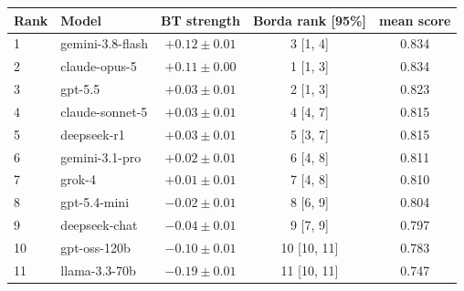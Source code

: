 \begin{tabular}{llccc}
\toprule
Rank & Model & BT strength & Borda rank [95\%] & mean score \\
\midrule
1 & gemini-3.8-flash & $+0.12 \pm 0.01$ & 3 [1, 4] & 0.834 \\
2 & claude-opus-5 & $+0.11 \pm 0.00$ & 1 [1, 3] & 0.834 \\
3 & gpt-5.5 & $+0.03 \pm 0.01$ & 2 [1, 3] & 0.823 \\
4 & claude-sonnet-5 & $+0.03 \pm 0.01$ & 4 [4, 7] & 0.815 \\
5 & deepseek-r1 & $+0.03 \pm 0.01$ & 5 [3, 7] & 0.815 \\
6 & gemini-3.1-pro & $+0.02 \pm 0.01$ & 6 [4, 8] & 0.811 \\
7 & grok-4 & $+0.01 \pm 0.01$ & 7 [4, 8] & 0.810 \\
8 & gpt-5.4-mini & $-0.02 \pm 0.01$ & 8 [6, 9] & 0.804 \\
9 & deepseek-chat & $-0.04 \pm 0.01$ & 9 [7, 9] & 0.797 \\
10 & gpt-oss-120b & $-0.10 \pm 0.01$ & 10 [10, 11] & 0.783 \\
11 & llama-3.3-70b & $-0.19 \pm 0.01$ & 11 [10, 11] & 0.747 \\
\bottomrule
\end{tabular}
